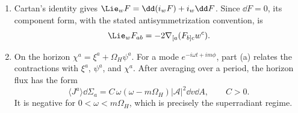 \begin{enumerate}[leftmargin=2.8em,itemsep=1.2em]
\begin{enumerate}[label=\alph*),leftmargin=2em]
\item Cartan's identity gives \(\Lie_wF=\dd(i_wF)+i_w\dd F\).  Since
\(\dd F=0\), its component form, with the stated antisymmetrization
convention, is
\[
 \Lie_wF_{ab}=-2\nabla_{[a}(F_{b]c}w^c).
\]

\item On the horizon \(\chi^a=\xi^a+\Omega_H\psi^a\).  For a mode
\(e^{-i\omega t+im\phi}\), part (a) relates the contractions with
\(\xi^a\), \(\psi^a\), and \(\chi^a\).  After averaging over a period, the
horizon flux has the form
\[
 \langle J^a\rangle\dd\Sigma_a
 =C\,\omega(\omega-m\Omega_H)|\mathcal A|^2\dd v\dd A,
 \qquad C>0.
\]
It is negative for \(0<\omega<m\Omega_H\), which is precisely the
superradiant regime.
\end{enumerate}
\end{enumerate}

